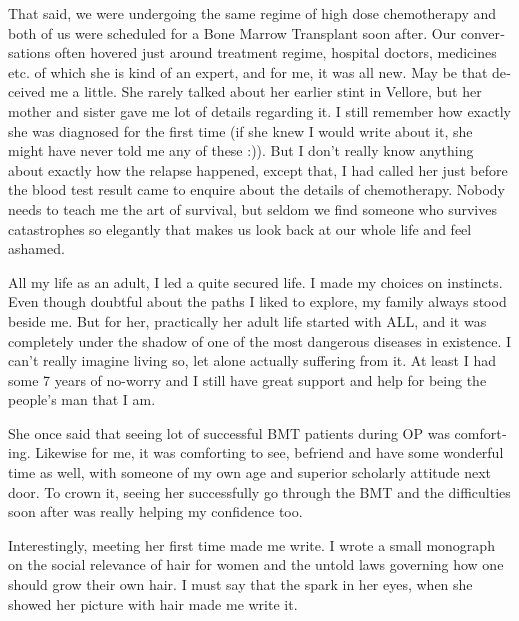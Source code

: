 \begin{english}
That said, we were undergoing the same regime of high dose chemotherapy and both of us were scheduled for a Bone Marrow Transplant soon after. Our conversations often hovered just around treatment regime, hospital doctors, medicines etc. of which she is kind of an expert, and for me, it was all new. May be that deceived me a little. She rarely talked about her earlier stint in Vellore, but her mother and sister gave me lot of details regarding it. I still remember how exactly she was diagnosed for the first time (if she knew I would write about it, she might have never told me any of these :)). But I don't really know anything about exactly how the relapse happened, except that, I had called her just before the blood test result came to enquire about the details of chemotherapy. Nobody needs to teach me the art of survival, but seldom we find someone who survives catastrophes so elegantly that makes us look back at our whole life and feel ashamed.

All my life as an adult, I led a quite secured life. I made my choices on instincts. Even though doubtful about the paths I liked to explore, my family always stood beside me. But for her, practically her adult life started with ALL, and it was completely under the shadow of one of the most dangerous diseases in existence. I can't really imagine living so, let alone actually suffering from it. At least I had some 7 years of no-worry and I still have great support and help for being the people's man that I am.

She once said that seeing lot of successful BMT patients during OP was comforting. Likewise for me, it was comforting to see, befriend and have some wonderful time as well, with someone of my own age and superior scholarly attitude next door. To crown it, seeing her successfully go through the BMT and the difficulties soon after was really helping my confidence too.

Interestingly, meeting her first time made me write. I wrote a small monograph on the social relevance of hair for women and the untold laws governing how one should grow their own hair. I must say  that the spark in her eyes, when she showed her picture with hair made me write it.
\end{english}
\newpage     
